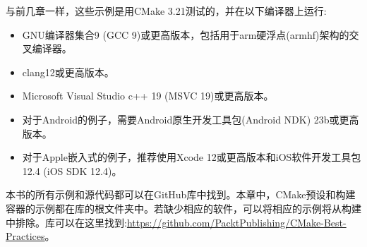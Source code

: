 与前几章一样，这些示例是用CMake 3.21测试的，并在以下编译器上运行:

\begin{itemize}
\item 
GNU编译器集合9 (GCC 9)或更高版本，包括用于arm硬浮点(armhf)架构的交叉编译器。

\item 
clang12或更高版本。

\item 
Microsoft Visual Studio c++ 19 (MSVC 19)或更高版本。

\item 
对于Android的例子，需要Android原生开发工具包(Android NDK) 23b或更高版本。

\item 
对于Apple嵌入式的例子，推荐使用Xcode 12或更高版本和iOS软件开发工具包12.4 (iOS SDK 12.4)。
\end{itemize}

本书的所有示例和源代码都可以在GitHub库中找到。本章中，CMake预设和构建容器的示例都在库的根文件夹中。若缺少相应的软件，可以将相应的示例将从构建中排除。库可以在这里找到:\url{https://github.com/PacktPublishing/CMake-Best-Practices}。



















